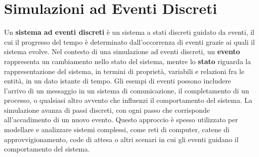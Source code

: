 \documentclass[12pt,a4paper,openright,twoside]{book}
\begin{document}
\chapter{Simulazioni ad Eventi Discreti}
\label{sec:panoramica-des}
Un \textbf{sistema ad eventi discreti} è un sistema a stati discreti guidato da eventi, il cui il progresso del tempo è determinato dall'occorrenza di eventi grazie ai quali il sistema evolve. Nel contesto di una simulazione ad eventi discreti, un \textbf{evento} rappresenta un cambiamento nello stato del sistema, mentre lo \textbf{stato} riguarda la rappresentazione del sistema, in termini di proprietà, variabili e relazioni fra le entità, in un dato istante di tempo.
Gli esempi di eventi possono includere l'arrivo di un messaggio in un sistema di comunicazione, il completamento di un processo, o qualsiasi altro avvento che influenzi il comportamento del sistema. La simulazione avanza di passi discreti, con ogni passo che corrisponde all'accadimento di un nuovo evento. 
Questo approccio è spesso utilizzato per modellare e analizzare sistemi complessi, come reti di computer, catene di approvvigionamento, code di attesa o altri scenari in cui gli eventi guidano il comportamento del sistema. 
\end{document}
